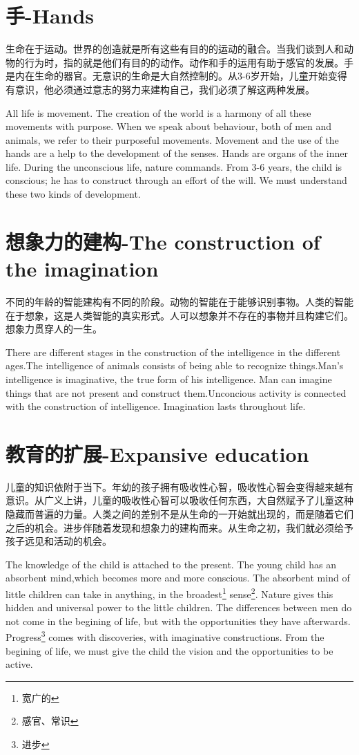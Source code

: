 \documentclass[lang=cn,10pt]{elegantbook}
\begin{document}
\chapter{手-Hands}

生命在于运动。世界的创造就是所有这些有目的的运动的融合。当我们谈到人和动物的行为时，指的就是他们有目的的动作。动作和手的运用有助于感官的发展。手是内在生命的器官。无意识的生命是大自然控制的。从3-6岁开始，儿童开始变得有意识，他必须通过意志的努力来建构自己，我们必须了解这两种发展。

All life is movement. The creation of the world is a harmony of all these movements with purpose. When we speak about behaviour, both of men and animals, we refer to their purposeful movements. Movement and the use of the hands are a help to the development of the senses. Hands are organs of the inner life. During the unconscious life, nature commands. From 3-6 years, the child is conscious; he has to construct through an effort of the will. We must understand these two kinds of development.

\chapter{想象力的建构-The construction of the imagination}

不同的年龄的智能建构有不同的阶段。动物的智能在于能够识别事物。人类的智能在于想象，这是人类智能的真实形式。人可以想象并不存在的事物并且构建它们。想象力贯穿人的一生。

There are different stages in the construction of the intelligence in the different ages.The intelligence of animals consists of being able to recognize things.Man's intelligence is imaginative, the true form of his intelligence. Man can imagine things that are not present and construct them.Unconcious activity is connected with the construction of intelligence. Imagination lasts throughout life.

\chapter{教育的扩展-Expansive education}

儿童的知识依附于当下。年幼的孩子拥有吸收性心智，吸收性心智会变得越来越有意识。从广义上讲，儿童的吸收性心智可以吸收任何东西，大自然赋予了儿童这种隐藏而普遍的力量。人类之间的差别不是从生命的一开始就出现的，而是随着它们之后的机会。进步伴随着发现和想象力的建构而来。从生命之初，我们就必须给予孩子远见和活动的机会。

The knowledge of the child is attached to the present. The young child has an absorbent mind,which becomes more and more conscious. The absorbent mind of little children can take in anything, in the broadest\footnote{宽广的} sense\footnote{感官、常识}. Nature gives this hidden and universal power to the little children. The differences between men do not come in the begining of life, but with the opportunities they have afterwards. Progress\footnote{进步} comes with discoveries, with imaginative constructions. From the begining of life, we must give the child the vision and the opportunities to be active.
\end{document}
